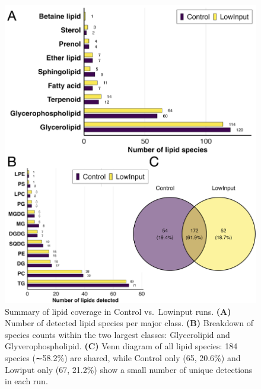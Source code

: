 \documentclass[10pt,letterpaper]{article}
\begin{document}





\begin{figure}[htp]
  \centering
  \includegraphics[width=\textwidth]{fig/supp/SuppFig4.png}
  \caption{
    Summary of lipid coverage in Control vs.\ Lowinput runs. 
    {\bf(A)} Number of detected lipid species per major class.
    {\bf(B)} Breakdown of species counts within the two largest classes: Glycerolipid and Glyverophospholipid.
    {\bf(C)} Venn diagram of all lipid species: 184 species (∼58.2\%) are shared, while Control only (65, 20.6\%) and Lowiput only (67, 21.2\%) show a small number of unique detections in each run.
  }
  \label{fig:S4}
\end{figure}
\end{document}
